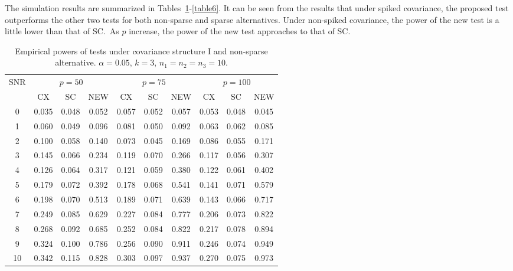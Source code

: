 \documentclass[12pt]{article} %
\DeclareMathOperator{\mytr}{tr}
\theoremstyle{definition}
\begin{document}
The simulation results are summarized in Tables~\ref{table1}-\ref{table6}. It can be seen from the results that under spiked covariance, the proposed test outperforms the other two tests for both non-sparse and sparse alternatives.
Under non-spiked covariance, the power of the new test is a little lower than that of SC.\ 
As $p$ increase, the power of the new test approaches to that of SC.



\begin{table}[!hbp]
    \caption{Empirical powers of tests under covariance structure I and non-sparse alternative. $\alpha=0.05$, $k=3$, $n_1=n_2=n_3=10$. }
    \label{table1}
    \centering
    \begin{tabular}{*{10}{c}}
    \toprule
    \multirow{2}{*}{SNR} &\multicolumn{3}{c}{$p=50$}&\multicolumn{3}{c}{$p=75$}&\multicolumn{3}{c}{$p=100$} \\
        \cmidrule(r){2-4}\cmidrule(r){5-7}\cmidrule(r){8-10}
        & CX & SC & NEW & CX &SC &NEW &CX & SC & NEW\\
    \midrule
0 & 0.035 & 0.048 & 0.052 & 0.057 & 0.052 & 0.057 & 0.053 & 0.048 & 0.045 \\ 
1 & 0.060 & 0.049 & 0.096 & 0.081 & 0.050 & 0.092 & 0.063 & 0.062 & 0.085 \\ 
2 & 0.100 & 0.058 & 0.140 & 0.073 & 0.045 & 0.169 & 0.086 & 0.055 & 0.171 \\ 
3 & 0.145 & 0.066 & 0.234 & 0.119 & 0.070 & 0.266 & 0.117 & 0.056 & 0.307 \\ 
4 & 0.126 & 0.064 & 0.317 & 0.121 & 0.059 & 0.380 & 0.122 & 0.061 & 0.402 \\ 
5 & 0.179 & 0.072 & 0.392 & 0.178 & 0.068 & 0.541 & 0.141 & 0.071 & 0.579 \\ 
6 & 0.198 & 0.070 & 0.513 & 0.189 & 0.071 & 0.639 & 0.143 & 0.066 & 0.717 \\ 
7 & 0.249 & 0.085 & 0.629 & 0.227 & 0.084 & 0.777 & 0.206 & 0.073 & 0.822 \\ 
8 & 0.268 & 0.092 & 0.685 & 0.252 & 0.084 & 0.822 & 0.217 & 0.078 & 0.894 \\ 
9 & 0.324 & 0.100 & 0.786 & 0.256 & 0.090 & 0.911 & 0.246 & 0.074 & 0.949 \\ 
10 & 0.342 & 0.115 & 0.828 & 0.303 & 0.097 & 0.937 & 0.270 & 0.075 & 0.973 \\ 
\bottomrule
\end{tabular}
\end{table}
\end{document}
